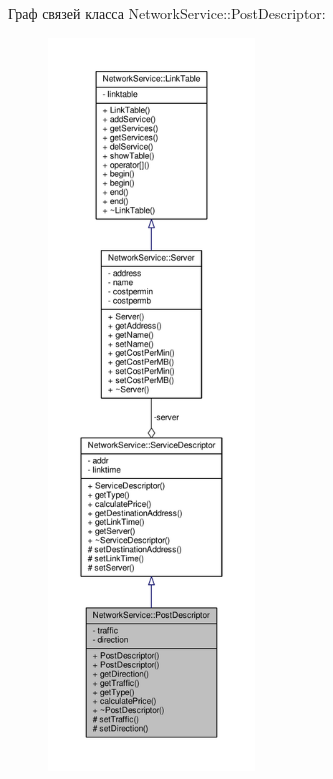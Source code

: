 Граф связей класса Network\+Service\+:\+:Post\+Descriptor\+:\nopagebreak
\begin{figure}[H]
\begin{center}
\leavevmode
\includegraphics[height=550pt]{class_network_service_1_1_post_descriptor__coll__graph}
\end{center}
\end{figure}
